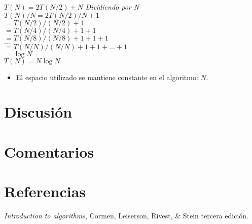\documentclass[twocolumn,11pts]{IEEEtran}
\begin{document}
$T(N)=2T(N/2)+N$ \textit{Dividiendo por N}\\
$T(N)/N=2T(N/2)/N+1$\\
$    =T(N/2)/(N/2)+1$\\
$    =T(N/4)/(N/4)+1+1$\\
$    =T(N/8)/(N/8)+1+1+1$\\
$...$\\
$    =T(N/N)/(N/N)+1+1+...+1$\\
$    =\log N$\\
$T(N)= N\log N$\\
\begin{itemize}
\item El espacio utilizado se mantiene constante en el algoritmo: $N$.
\end{itemize} 
\section{Discusión}

\section{Comentarios}

\section{Referencias}
\textit {Introduction to algorithms}, Cormen, Leiserson, Rivest, \& Stein tercera edición.

%
%


\end{document}
